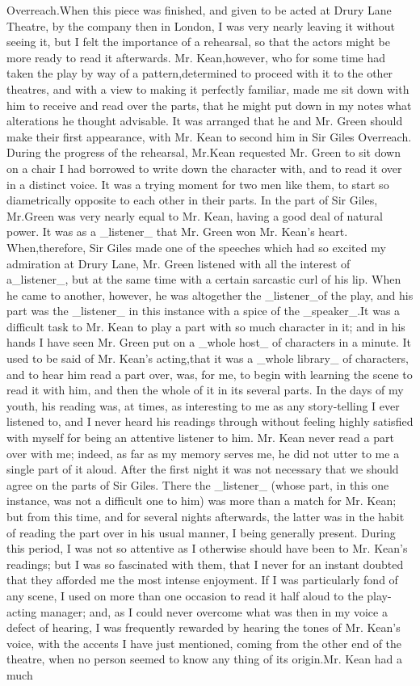 \documentclass[a4paper]{article}
\begin{document}
Overreach.When this piece was finished, and given to be acted at Drury Lane Theatre, by the company then in London, I was very nearly leaving it without seeing it, but I felt the importance of a rehearsal, so that the actors might be more ready to read it afterwards. Mr. Kean,however, who for some time had taken the play by way of a pattern,determined to proceed with it to the other theatres, and with a view to making it perfectly familiar, made me sit down with him to receive and read over the parts, that he might put down in my notes what alterations he thought advisable. It was arranged that he and Mr. Green should make their first appearance, with Mr. Kean to second him in Sir Giles Overreach. During the progress of the rehearsal, Mr.Kean requested Mr. Green to sit down on a chair I had borrowed to write down the character with, and to read it over in a distinct voice. It was a trying moment for two men like them, to start so diametrically opposite to each other in their parts. In the part of Sir Giles, Mr.Green was very nearly equal to Mr. Kean, having a good deal of natural power. It was as a _listener_ that Mr. Green won Mr. Kean's heart. When,therefore, Sir Giles made one of the speeches which had so excited my admiration at Drury Lane, Mr. Green listened with all the interest of a_listener_, but at the same time with a certain sarcastic curl of his lip. When he came to another, however, he was altogether the _listener_of the play, and his part was the _listener_ in this instance with a spice of the _speaker_.It was a difficult task to Mr. Kean to play a part with so much character in it; and in his hands I have seen Mr. Green put on a _whole host_ of characters in a minute. It used to be said of Mr. Kean's acting,that it was a _whole library_ of characters, and to hear him read a part over, was, for me, to begin with learning the scene to read it with him, and then the whole of it in its several parts. In the days of my youth, his reading was, at times, as interesting to me as any story-telling I ever listened to, and I never heard his readings through without feeling highly satisfied with myself for being an attentive listener to him. Mr. Kean never read a part over with me; indeed, as far as my memory serves me, he did not utter to me a single part of it aloud. After the first night it was not necessary that we should agree on the parts of Sir Giles. There the _listener_ (whose part, in this one instance, was not a difficult one to him) was more than a match for Mr. Kean; but from this time, and for several nights afterwards, the latter was in the habit of reading the part over in his usual manner, I being generally present. During this period, I was not so attentive as I otherwise should have been to Mr. Kean's readings; but I was so fascinated with them, that I never for an instant doubted that they afforded me the most intense enjoyment. If I was particularly fond of any scene, I used on more than one occasion to read it half aloud to the play-acting manager; and, as I could never overcome what was then in my voice a defect of hearing, I was frequently rewarded by hearing the tones of Mr. Kean's voice, with the accents I have just mentioned, coming from the other end of the theatre, when no person seemed to know any thing of its origin.Mr. Kean had a much 
\end{document}
